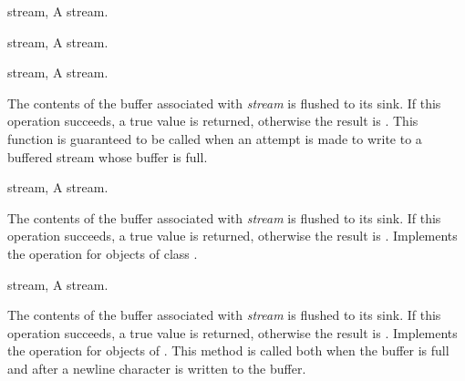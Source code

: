 \begin{optDefinition}
\begin{specargs}
    \item[stream, \classref{buffered-stream}] A stream.
\end{specargs}

\begin{specargs}
    \item[stream, \classref{file-stream}] A stream.
\end{specargs}

\begin{genericargs}
    \item[stream, \classref{buffered-stream}] A stream.
\end{genericargs}
%
\result%
The contents of the buffer associated with {\em stream} is flushed to
its sink. If this operation succeeds, a true value is returned, otherwise the
result is \nil{}.
%
\remarks%
This function is guaranteed to be called when an attempt is made to
write to a buffered stream whose buffer is full.

\begin{specargs}
    \item[stream, \classref{buffered-stream}] A stream.
\end{specargs}
%
\result%
The contents of the buffer associated with {\em stream} is flushed to
its sink. If this operation succeeds, a true value is returned, otherwise the
result is \nil{}.
%
\remarks%
Implements the  operation for objects of class
.

\begin{specargs}
    \item[stream, \classref{file-stream}] A stream.
\end{specargs}
%
\result%
The contents of the buffer associated with {\em stream} is flushed to
its sink. If this operation succeeds, a true value is returned, otherwise the
result is \nil{}.
%
\remarks%
Implements the  operation for objects of
. This method is called both when the buffer is full and
after a newline character is written to the buffer.


\end{optDefinition}
